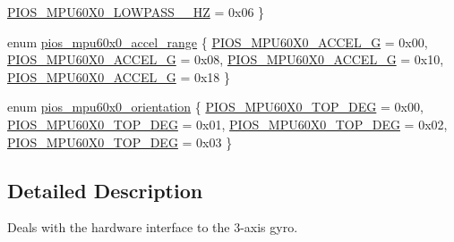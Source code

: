\begin{DoxyCompactItemize}
\hyperlink{group___p_i_o_s___m_p_u60_x0_ggacce1988bc994f5ade6ac748c2bf0b924a9cc1d8543b5451c433287b70d5265185}{P\-I\-O\-S\-\_\-\-M\-P\-U60\-X0\-\_\-\-L\-O\-W\-P\-A\-S\-S\-\_\-\_\-\-H\-Z} = 0x06
 \}
\item 
enum \hyperlink{group___p_i_o_s___m_p_u60_x0_ga8f297bddae3eb43bbf7b54abc6494992}{pios\-\_\-mpu60x0\-\_\-accel\-\_\-range} \{ \hyperlink{group___p_i_o_s___m_p_u60_x0_gga8f297bddae3eb43bbf7b54abc6494992aa0e4d3e7983359d6a4be9b8da4a3975c}{P\-I\-O\-S\-\_\-\-M\-P\-U60\-X0\-\_\-\-A\-C\-C\-E\-L\-\_\-G} = 0x00, 
\hyperlink{group___p_i_o_s___m_p_u60_x0_gga8f297bddae3eb43bbf7b54abc6494992a32c252c9136cb59df2e5da3b985d564f}{P\-I\-O\-S\-\_\-\-M\-P\-U60\-X0\-\_\-\-A\-C\-C\-E\-L\-\_\-G} = 0x08, 
\hyperlink{group___p_i_o_s___m_p_u60_x0_gga8f297bddae3eb43bbf7b54abc6494992ae5f9e992191f97f3c9281cebf7678db1}{P\-I\-O\-S\-\_\-\-M\-P\-U60\-X0\-\_\-\-A\-C\-C\-E\-L\-\_\-G} = 0x10, 
\hyperlink{group___p_i_o_s___m_p_u60_x0_gga8f297bddae3eb43bbf7b54abc6494992acd0d4a72a2500f3189ac87feba6e1751}{P\-I\-O\-S\-\_\-\-M\-P\-U60\-X0\-\_\-\-A\-C\-C\-E\-L\-\_\-G} = 0x18
 \}
\item 
enum \hyperlink{group___p_i_o_s___m_p_u60_x0_ga0b97f6902b1564a6eedf92c8937a2a67}{pios\-\_\-mpu60x0\-\_\-orientation} \{ \hyperlink{group___p_i_o_s___m_p_u60_x0_gga0b97f6902b1564a6eedf92c8937a2a67ae79874b7b06bf988c95f1a74fc600b15}{P\-I\-O\-S\-\_\-\-M\-P\-U60\-X0\-\_\-\-T\-O\-P\-\_\-D\-E\-G} = 0x00, 
\hyperlink{group___p_i_o_s___m_p_u60_x0_gga0b97f6902b1564a6eedf92c8937a2a67a39bf2dfcfd16651787388e2c1012ce51}{P\-I\-O\-S\-\_\-\-M\-P\-U60\-X0\-\_\-\-T\-O\-P\-\_\-D\-E\-G} = 0x01, 
\hyperlink{group___p_i_o_s___m_p_u60_x0_gga0b97f6902b1564a6eedf92c8937a2a67a78ca15e13573b517c5d9e062bbda76a0}{P\-I\-O\-S\-\_\-\-M\-P\-U60\-X0\-\_\-\-T\-O\-P\-\_\-D\-E\-G} = 0x02, 
\hyperlink{group___p_i_o_s___m_p_u60_x0_gga0b97f6902b1564a6eedf92c8937a2a67a39826b1efa17eeae681cd584f5713e0c}{P\-I\-O\-S\-\_\-\-M\-P\-U60\-X0\-\_\-\-T\-O\-P\-\_\-D\-E\-G} = 0x03
 \}
\end{DoxyCompactItemize}


\subsection{Detailed Description}
Deals with the hardware interface to the 3-\/axis gyro. 

